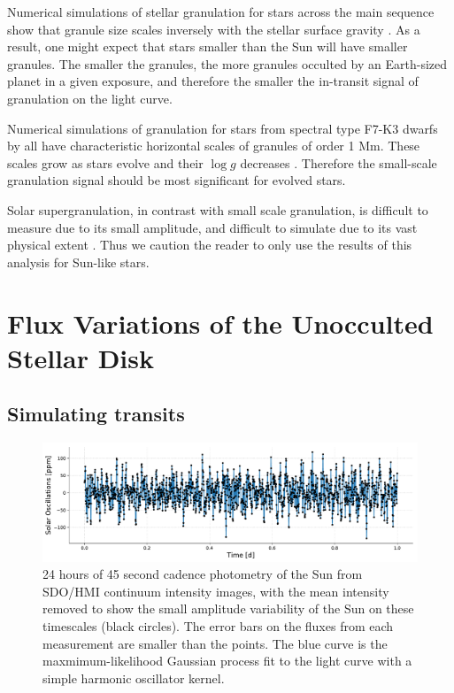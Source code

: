 Numerical simulations of stellar granulation for stars across the main sequence show that granule size scales inversely with the stellar surface gravity \citep[see review by][]{Nordlund2009, Kupka2017}. As a result, one might expect that stars smaller than the Sun will have smaller granules. The smaller the granules, the more granules occulted by an Earth-sized planet in a given exposure, and therefore the smaller the in-transit signal of granulation on the light curve. 

Numerical simulations of granulation for stars from spectral type F7-K3 dwarfs by \citet{Trampedach2013} all have characteristic horizontal scales of granules of order 1 Mm. These scales grow as stars evolve and their $\log g$ decreases \citep[see also][]{Trampedach2017}. Therefore the small-scale granulation signal should be most significant for evolved stars.

Solar supergranulation, in contrast with small scale granulation, is difficult to measure due to its small amplitude, and difficult to simulate due to its vast physical extent \citep{Rieutord2010}. Thus we caution the reader to only use the results of this analysis for Sun-like stars.

\section{Flux Variations of the Unocculted Stellar Disk} 
\label{sec:photometry}

\subsection{Simulating transits}

\begin{figure}
    \centering
    \includegraphics[scale=0.6]{stash/oscillations.pdf}
    \caption{24 hours of 45 second cadence photometry of the Sun from SDO/HMI continuum intensity images, with the mean intensity removed to show the small amplitude variability of the Sun on these timescales (black circles). The error bars on the fluxes from each measurement are smaller than the points. The blue curve is the maxmimum-likelihood Gaussian process fit to the light curve with a simple harmonic oscillator kernel. }
    \label{fig:pmodephot}
\end{figure}

